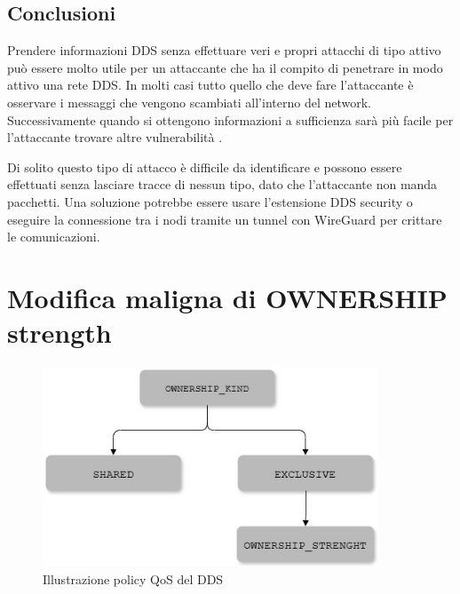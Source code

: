 \subsection{Conclusioni}
Prendere informazioni DDS senza effettuare veri e propri
attacchi di tipo attivo può essere molto utile per un attaccante che 
ha il compito di penetrare in modo attivo
una rete DDS. In molti casi tutto quello che deve fare l'attaccante
è osservare i messaggi che vengono scambiati all'interno del network.
Successivamente quando si ottengono informazioni a sufficienza sarà più
facile per l'attaccante trovare altre vulnerabilità
\cite{White2017AnII}.

Di solito questo tipo di attacco è difficile da identificare e possono essere
effettuati senza lasciare tracce di nessun tipo, dato che l'attaccante non 
manda pacchetti.
Una soluzione potrebbe essere usare l'estensione DDS security o 
eseguire la connessione tra i nodi tramite un tunnel con WireGuard per crittare
le comunicazioni.






%     






\section{Modifica maligna di OWNERSHIP strength}

\begin{figure}[H]
    \centering
    \includegraphics[width=10cm, keepaspectratio]{img/Policy QoS DDS_2.jpg}
    \caption{Illustrazione policy QoS del DDS}\label{Mappa QoS}
\end{figure}


